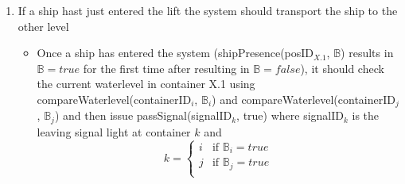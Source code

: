 \begin{enumerate}
	\item If a ship hast just entered the lift the system should transport the ship to the other level
		\begin{itemize}
			\item Once a ship has entered the system (shipPresence(posID$_{X.1}$, $\mathbb{B}$) results in $\mathbb{B} = true$ for the first time after resulting in $\mathbb{B} = false$), it should check the current waterlevel in container X.1 using compareWaterlevel(containerID$_i$, $\mathbb{B}_i$) and compareWaterlevel(containerID$_j$, $\mathbb{B}_j$) and then issue passSignal(signalID$_k$, true) where signalID$_k$ is the leaving signal light at container $k$ and
			\begin{equation*}
				k = 
				\begin{cases}
					i & \text{if } \mathbb{B}_i = true\\
					j & \text{if } \mathbb{B}_j = true\\
				\end{cases}
			\end{equation*}
		\end{itemize}
	\end{enumerate}